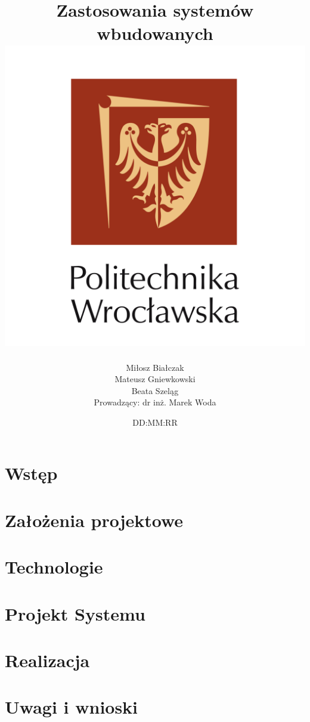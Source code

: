 \documentclass[12pt]{report}
\title{
        {Zastosowania systemów wbudowanych}\\
        {\includegraphics{pwr.png}}
}
\author{
Miłosz Białczak\\
Mateusz Gniewkowski\\
Beata Szeląg\\[15pt]
Prowadzący: dr inż. Marek Woda
}
\date{DD:MM:RR}
\begin{document}
\maketitle

\tableofcontents

%

\chapter{Wstęp}


\chapter{Założenia projektowe}


\chapter{Technologie}


\chapter{Projekt Systemu}


\chapter{Realizacja}


\chapter{Uwagi i wnioski}

\end{document}
